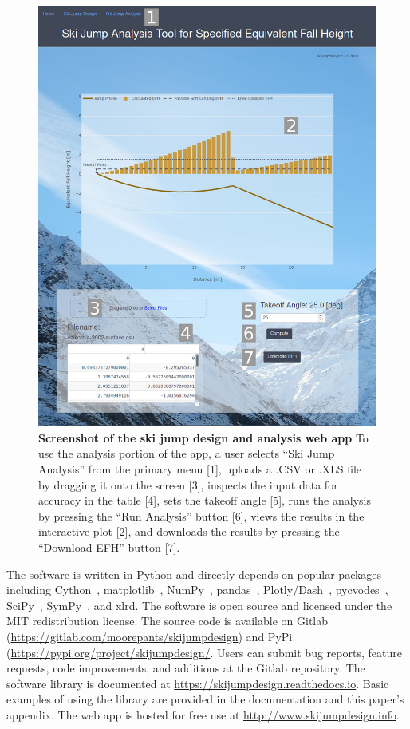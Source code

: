 \documentclass[smallextended]{svjour3}       %
\begin{document}
\begin{figure}
  \centering
  \includegraphics[width=5.00in]{figures/web-app-screenshot.png}
  \caption{\textbf{Screenshot of the ski jump design and analysis web app} To
    use the analysis portion of the app, a user selects ``Ski Jump Analysis''
    from the primary menu [1], uploads a .CSV or .XLS file by dragging it onto
    the screen [3], inspects the input data for accuracy in the table [4], sets
    the takeoff angle [5], runs the analysis by pressing the ``Run Analysis''
    button [6], views the results in the interactive plot [2], and downloads
    the results by pressing the ``Download EFH'' button [7].}
  \label{fig:web-app-screenshot}
\end{figure}

The software is written in Python and directly depends on popular packages
including Cython~\cite{Behnel2011}, matplotlib~\cite{Hunter2007},
NumPy~\cite{Oliphant2006}, pandas~\cite{McKinney2020},
Plotly/Dash~\cite{Plotly2015}, pycvodes~\cite{Dahlgren2018},
SciPy~\cite{Virtanen2020}, SymPy~\cite{Meurer2017}, and xlrd. The software is
open source and licensed under the MIT redistribution license. The source code
is available on Gitlab (\url{https://gitlab.com/moorepants/skijumpdesign}) and
PyPi (\url{https://pypi.org/project/skijumpdesign/}. Users can submit bug
reports, feature requests, code improvements, and additions at the Gitlab
repository. The software library is documented at
\url{https://skijumpdesign.readthedocs.io}. Basic examples of using the library
are provided in the documentation and this paper's appendix. The web app is
hosted for free use at \url{http://www.skijumpdesign.info}.
\end{document}

